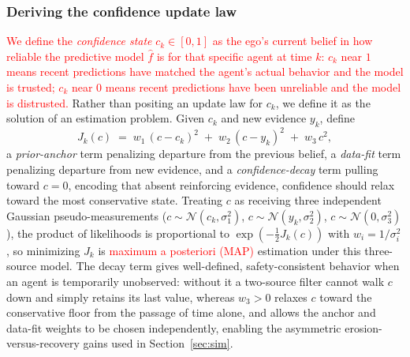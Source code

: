 \documentclass[letterpaper, 10 pt, conference]{ieeeconf}
\begin{document}
\subsubsection{Deriving the confidence update law}
\label{sec:confidence-law}

\textcolor{red}{We define the \emph{confidence state} $c_k \in [0,1]$ as the ego's current belief in how reliable the predictive model $\hat f$ is for that specific agent at time $k$: $c_k$ near $1$ means recent predictions have matched the agent's actual behavior and the model is trusted; $c_k$ near $0$ means recent predictions have been unreliable and the model is distrusted.} Rather than positing an update law for $c_k$, we define it as the solution of an estimation problem. Given $c_k$ and new evidence $y_k$, define
\begin{equation}
J_k(c) \;=\; w_1\,(c-c_k)^2 \;+\; w_2\,(c-y_k)^2 \;+\; w_3\, c^2, \label{eq:Jk}
\end{equation}
a \emph{prior-anchor} term penalizing departure from the previous belief, a \emph{data-fit} term penalizing departure from new evidence, and a \emph{confidence-decay} term pulling toward $c=0$, encoding that absent reinforcing evidence, confidence should relax toward the most conservative state. Treating $c$ as receiving three independent Gaussian pseudo-measurements ($c\sim\mathcal N(c_k,\sigma_1^2)$, $c\sim\mathcal N(y_k,\sigma_2^2)$, $c\sim\mathcal N(0,\sigma_3^2)$), the product of likelihoods is proportional to $\exp(-\tfrac12 J_k(c))$ with $w_i=1/\sigma_i^2$, so minimizing $J_k$ is \textcolor{red}{maximum a posteriori (MAP)} estimation under this three-source model. The decay term gives well-defined, safety-consistent behavior when an agent is temporarily unobserved: without it a two-source filter cannot walk $c$ down and simply retains its last value, whereas $w_3>0$ relaxes $c$ toward the conservative floor from the passage of time alone, and allows the anchor and data-fit weights to be chosen independently, enabling the asymmetric erosion-versus-recovery gains used in Section~\ref{sec:sim}.
\end{document}
